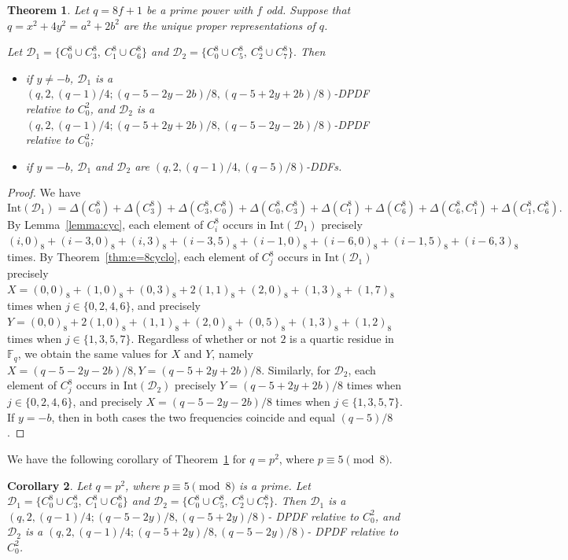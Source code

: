 \documentclass[12pt, a4paper]{article}
\newtheorem{theorem}{Theorem}[section]
\newtheorem{corollary}[theorem]{Corollary}
\theoremstyle{definition}
\begin{document}
\begin{theorem}\label{thm:DPDF2union23}
Let $q=8f+1$ be a prime power with $f$ odd. Suppose that
$q=x^2+4y^2=a^2+2b^2$ are the unique proper representations of $q$. 
    
Let
	$
	\mathcal D_1=\{C_0^8\cup C_3^8,\ C_1^8\cup C_6^8\}
	$
	and
	$
	\mathcal D_2=\{C_0^8\cup C_5^8,\ C_2^8\cup C_7^8\}.
	$
Then
\begin{itemize}
\item if $y\ne -b$, $\mathcal D_1$ is a
	$
	(q,2,(q-1)/4;(q-5-2y-2b)/8,(q-5+2y+2b)/8)
	$-DPDF relative to $C_0^2$, and $\mathcal D_2$ is a
	$
	(q,2,(q-1)/4;(q-5+2y+2b)/8,(q-5-2y-2b)/8)
	$-DPDF relative to $C_0^2$;
\item if $y=-b$, $\mathcal D_1$ and $\mathcal D_2$ are $(q,2,(q-1)/4,(q-5)/8)$-DDFs.
\end{itemize}
\end{theorem}

\begin{proof}
	We have
	\[
	\mathrm{Int}(\mathcal D_1)
	=
	\Delta(C_0^8)+\Delta(C_3^8)
	+\Delta(C_3^8,C_0^8)+\Delta(C_0^8,C_3^8)
	+\Delta(C_1^8)+\Delta(C_6^8)
	+\Delta(C_6^8,C_1^8)+\Delta(C_1^8,C_6^8).
	\]
	By Lemma~\ref{lemma:cyc}, each element of $C_i^8$ occurs in $\mathrm{Int}(\mathcal D_1)$
	precisely
	$(i,0)_8+(i-3,0)_8+(i,3)_8+(i-3,5)_8
	+(i-1,0)_8+(i-6,0)_8+(i-1,5)_8+(i-6,3)_8$ 
	times.
	By Theorem~\ref{thm:e=8cyclo}, each element of $C_j^8$ occurs in $\mathrm{Int}(\mathcal D_1)$
	precisely
	$
	X=(0,0)_8+(1,0)_8+(0,3)_8+2(1,1)_8+(2,0)_8+(1,3)_8+(1,7)_8
	$
	times when $j\in\{0,2,4,6\}$, and precisely
	$
	Y=(0,0)_8+2(1,0)_8+(1,1)_8+(2,0)_8+(0,5)_8+(1,3)_8+(1,2)_8
	$
	times when $j\in\{1,3,5,7\}$.
	Regardless of whether or not $2$ is a quartic 
	residue in $\mathbb F_q$, we obtain the same values
	for $X$ and $Y$, namely
	$
	X=(q-5-2y-2b)/8, 
	Y=(q-5+2y+2b)/8.
	$
Similarly, for $\mathcal D_2$, each element of $C_j^8$ occurs in $\mathrm{Int}(\mathcal D_2)$ precisely $Y=(q-5+2y+2b)/8$ times when $j\in\{0,2,4,6\}$, and precisely $X=(q-5-2y-2b)/8$ times when $j\in\{1,3,5,7\}$.
If $y=-b$, then in both cases the two frequencies coincide and equal $(q-5)/8$.
\end{proof}


We have the following corollary of Theorem~\ref{thm:DPDF2union23} for $q=p^2$, where $p\equiv5\pmod8$.

\begin{corollary}\label{cor:DPDFp2}
	Let $q=p^2$, where $p\equiv5\pmod8$ is a prime. Let
	$
	\mathcal D_1=\{C_0^8\cup C_3^8,\ C_1^8\cup C_6^8\}
	$ 
	and
	$
	\mathcal D_2=\{C_0^8\cup C_5^8,\ C_2^8\cup C_7^8\}.
	$
	Then $\mathcal D_1$ is a
	$
	(q,2,(q-1)/4;(q-5-2y)/8,(q-5+2y)/8)
	$- 
	DPDF relative to $C_0^2$, and $\mathcal D_2$ is a
	$
	(q,2,(q-1)/4;(q-5+2y)/8,(q-5-2y)/8)
	$-
	DPDF relative to $C_0^2$.
\end{corollary}
\end{document}
